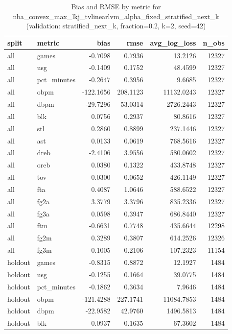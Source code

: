 \begin{table}
\caption{Bias and RMSE by metric for nba_convex_max_lkj_tvlinearlvm_alpha_fixed_stratified_next_k (validation: stratified_next_k, fraction=0.2, k=2, seed=42)}
\label{tab:nba_convex_max_lkj_tvlinearlvm_alpha_fixed_stratified_next_k_vs_stratified_next_k_f20_k2_s42_bias_rmse}
\begin{tabular}{llrrrr}
\toprule
split & metric & bias & rmse & avg\_log\_loss & n\_obs \\
\midrule
all & games & -0.7098 & 0.7936 & 13.2126 & 12327 \\
all & usg & -0.1409 & 0.1752 & 48.4599 & 12327 \\
all & pct\_minutes & -0.2647 & 0.3956 & 9.6685 & 12327 \\
all & obpm & -122.1656 & 208.1123 & 11132.0243 & 12327 \\
all & dbpm & -29.7296 & 53.0314 & 2726.2443 & 12327 \\
all & blk & 0.0756 & 0.2937 & 80.8616 & 12327 \\
all & stl & 0.2860 & 0.8899 & 237.1446 & 12327 \\
all & ast & 0.0133 & 0.0619 & 768.5616 & 12327 \\
all & dreb & -2.4106 & 3.9556 & 580.0602 & 12327 \\
all & oreb & 0.0380 & 0.1322 & 433.8748 & 12327 \\
all & tov & 0.0300 & 0.0652 & 426.1149 & 12327 \\
all & fta & 0.4087 & 1.0646 & 588.6522 & 12327 \\
all & fg2a & 3.3779 & 3.3796 & 835.2336 & 12327 \\
all & fg3a & 0.0598 & 0.3947 & 686.8440 & 12327 \\
all & ftm & -0.6631 & 0.7748 & 435.6644 & 12298 \\
all & fg2m & 0.3289 & 0.3807 & 614.2526 & 12326 \\
all & fg3m & 0.1005 & 0.2106 & 107.2323 & 11154 \\
holdout & games & -0.8315 & 0.8872 & 12.1927 & 1484 \\
holdout & usg & -0.1255 & 0.1664 & 39.0775 & 1484 \\
holdout & pct\_minutes & -0.1862 & 0.3634 & 7.9646 & 1484 \\
holdout & obpm & -121.4288 & 227.1741 & 11084.7853 & 1484 \\
holdout & dbpm & -22.9582 & 42.9760 & 1496.5813 & 1484 \\
holdout & blk & 0.0937 & 0.1635 & 67.3602 & 1484 \\

\end{tabular}
\end{table}
